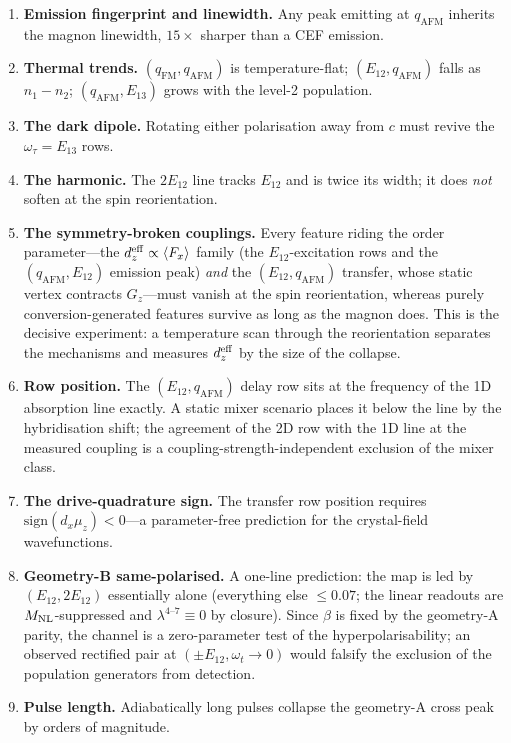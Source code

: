 \documentclass[11pt,a4paper]{article}
\newcommand{\qafm}{q_{\mathrm{AFM}}}
\newcommand{\qfm}{q_{\mathrm{FM}}}
\newcommand{\Mnl}{M_{\rm NL}}
\begin{document}
\begin{enumerate}
\item \textbf{Emission fingerprint and linewidth.}  Any peak emitting
  at $\qafm$ inherits the magnon linewidth, $15\times$ sharper than a
  CEF emission.
\item \textbf{Thermal trends.}  $(\qfm,\qafm)$ is temperature-flat;
  $(E_{12},\qafm)$ falls as $n_1-n_2$; $(\qafm,E_{13})$ grows with the
  level-2 population.
\item \textbf{The dark dipole.}  Rotating either polarisation away from
  $c$ must revive the $\omega_\tau=E_{13}$ rows.
\item \textbf{The harmonic.}  The $2E_{12}$ line tracks $E_{12}$ and is
  twice its width; it does \emph{not} soften at the spin reorientation.
\item \textbf{The symmetry-broken couplings.}  Every feature riding
  the order parameter---the $d_z^{\rm eff}\propto\langle F_x\rangle$
  family (the $E_{12}$-excitation rows and the $(\qafm,E_{12})$
  emission peak) \emph{and} the $(E_{12},\qafm)$ transfer, whose static
  vertex contracts $G_z$---must vanish at the spin reorientation,
  whereas purely conversion-generated features survive as long as the
  magnon does.  This is the decisive experiment: a temperature scan
  through the reorientation separates the mechanisms and measures
  $d_z^{\rm eff}$ by the size of the collapse.
\item \textbf{Row position.}  The $(E_{12},\qafm)$ delay row sits at
  the frequency of the 1D absorption line exactly.  A static mixer
  scenario places it below the line by the hybridisation shift; the
  agreement of the 2D row with the 1D line at the measured coupling is
  a coupling-strength-independent exclusion of the mixer class.
\item \textbf{The drive-quadrature sign.}  The transfer row position
  requires $\mathrm{sign}(d_x\mu_z)<0$---a parameter-free prediction
  for the crystal-field wavefunctions.
\item \textbf{Geometry-B same-polarised.}  A one-line prediction: the
  map is led by $(E_{12},2E_{12})$ essentially alone (everything else
  $\leq0.07$; the linear readouts are $\Mnl$-suppressed and
  $\lambda^{4\text{--}7}\equiv0$ by closure).  Since $\beta$ is fixed by
  the geometry-A parity, the channel is a zero-parameter test of the
  hyperpolarisability; an observed rectified pair at
  $(\pm E_{12},\omega_t\!\to\!0)$ would falsify the exclusion of the
  population generators from detection.
\item \textbf{Pulse length.}  Adiabatically long pulses collapse the
  geometry-A cross peak by orders of magnitude.
\end{enumerate}
\end{document}
